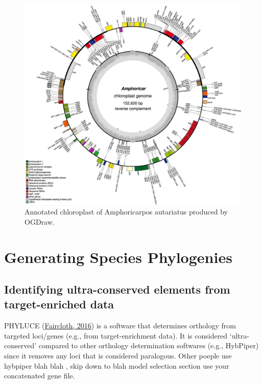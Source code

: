 \documentclass[
  12pt,
]{article}
\begin{document}
\begin{figure}
\includegraphics[width=1\linewidth]{Images/GeSeqJob-20240601-170716_Amphoricarpos_autariatus_OGDRAW} \caption{Annotated chloroplast of Amphoricarpos autariatus produced by OGDraw.}\label{fig:ogdraw}
\end{figure}

\hypertarget{generating-species-phylogenies}{%
\section{Generating Species Phylogenies}\label{generating-species-phylogenies}}

\hypertarget{identifying-ultra-conserved-elements-from-target-enriched-data}{%
\subsection{Identifying ultra-conserved elements from target-enriched data}\label{identifying-ultra-conserved-elements-from-target-enriched-data}}

PHYLUCE (\protect\hyperlink{ref-Faircloth2016}{Faircloth, 2016}) is a software that determines orthology from targeted loci/genes (e.g., from target-enrichment data). It is considered `ultra-conserved' compared to other orthology determination softwares (e.g., HybPiper) since it removes any loci that is considered paralogous. Other poeple use hybpiper blah blah , skip down to blah model selection section use your concatenated gene file.
\end{document}

